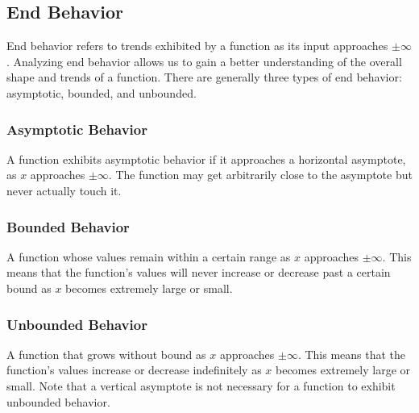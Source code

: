 \documentclass[11pt]{article}
\begin{document}
\subsection{End Behavior}
End behavior refers to trends exhibited by a function as its input approaches $\pm\infty$. Analyzing end behavior allows us to gain a better understanding of the overall shape and trends of a function. There are generally three types of end behavior: asymptotic, bounded, and unbounded.

\subsubsection*{Asymptotic Behavior}
A function exhibits asymptotic behavior if it approaches a horizontal asymptote, as $x$ approaches $\pm\infty$. The function may get arbitrarily close to the asymptote but never actually touch it.

\begin{center}
\end{center}

\subsubsection*{Bounded Behavior}
A function whose values remain within a certain range as $x$ approaches $\pm\infty$. This means that the function's values will never increase or decrease past a certain bound as $x$ becomes extremely large or small.

\begin{center}
\end{center}

\subsubsection*{Unbounded Behavior}
A function that grows without bound as $x$ approaches $\pm\infty$. This means that the function's values increase or decrease indefinitely as $x$ becomes extremely large or small. Note that a vertical asymptote is not necessary for a function to exhibit unbounded behavior.
\end{document}
